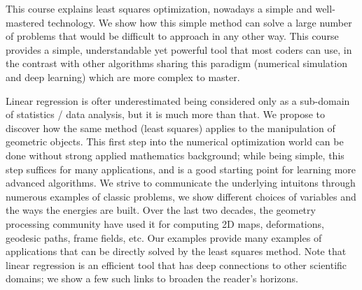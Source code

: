 \documentclass[notitlepage,oneside]{book}
\begin{document}
This course explains least squares optimization, nowadays a simple and well-mastered technology.
We show how this simple method can solve a large number of problems that would be difficult to approach in any other way.
This course provides a simple, understandable yet powerful tool that most coders can use,
in the contrast with other algorithms sharing this paradigm (numerical simulation and deep learning) which are more complex to master.

Linear regression is ofter underestimated being considered only as a sub-domain of statistics / data analysis, but it is much more than that.
We propose to discover how the same method (least squares) applies to the manipulation of geometric objects.
This first step into the numerical optimization world can be done without strong applied mathematics background;
while being simple, this step suffices for many applications, and is a good starting point for learning more advanced algorithms.
We strive to communicate the underlying intuitons through numerous examples of classic problems, we show different choices of variables and the ways the energies are built.
Over the last two decades, the geometry processing community have used it for computing 2D maps, deformations, geodesic paths, frame fields, etc.
Our examples provide many examples of applications that can be directly solved by the least squares method.
Note that linear regression is an efficient tool that has deep connections to other scientific domains;
we show a few such links to broaden the reader's horizons.
\end{document}
